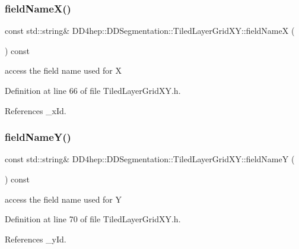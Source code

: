 \subsubsection{\texorpdfstring{field\+Name\+X()}{fieldNameX()}}
{\footnotesize\ttfamily const std\+::string\& D\+D4hep\+::\+D\+D\+Segmentation\+::\+Tiled\+Layer\+Grid\+X\+Y\+::field\+NameX (\begin{DoxyParamCaption}{ }\end{DoxyParamCaption}) const\hspace{0.3cm}{\ttfamily [inline]}}



access the field name used for X 



Definition at line 66 of file Tiled\+Layer\+Grid\+X\+Y.\+h.



References \+\_\+x\+Id.

\hypertarget{class_d_d4hep_1_1_d_d_segmentation_1_1_tiled_layer_grid_x_y_aec99e9725ef4ca55326a79c01feeb24f}{}\label{class_d_d4hep_1_1_d_d_segmentation_1_1_tiled_layer_grid_x_y_aec99e9725ef4ca55326a79c01feeb24f} 
\subsubsection{\texorpdfstring{field\+Name\+Y()}{fieldNameY()}}
{\footnotesize\ttfamily const std\+::string\& D\+D4hep\+::\+D\+D\+Segmentation\+::\+Tiled\+Layer\+Grid\+X\+Y\+::field\+NameY (\begin{DoxyParamCaption}{ }\end{DoxyParamCaption}) const\hspace{0.3cm}{\ttfamily [inline]}}



access the field name used for Y 



Definition at line 70 of file Tiled\+Layer\+Grid\+X\+Y.\+h.



References \+\_\+y\+Id.

\hypertarget{class_d_d4hep_1_1_d_d_segmentation_1_1_tiled_layer_grid_x_y_a6fe003c4987365ae0eb58db4c5889f43}{}\label{class_d_d4hep_1_1_d_d_segmentation_1_1_tiled_layer_grid_x_y_a6fe003c4987365ae0eb58db4c5889f43} 
